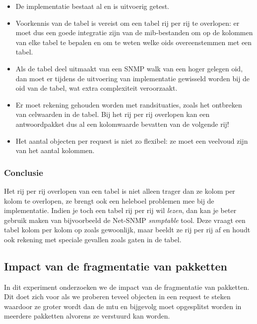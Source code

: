 \begin{itemize}
	\item De implementatie bestaat al en is uitvoerig getest.
	\item Voorkennis van de tabel is vereist om een tabel rij per rij te overlopen: er moet dus een goede integratie zijn van de \gls{mib}-bestanden
		om op de kolommen van elke tabel te bepalen en om te weten welke \glspl{oid} overeenstemmen met een tabel.
	\item Als de tabel deel uitmaakt van een SNMP walk van een hoger gelegen \gls{oid},
		dan moet er tijdens de uitvoering van implementatie gewisseld worden bij de \gls{oid} van de tabel, wat extra complexiteit veroorzaakt.
	\item Er moet rekening gehouden worden met randsituaties, zoals het ontbreken van celwaarden in de tabel\cite{net-snmp-table-holes}.
		Bij het rij per rij overlopen kan een antwoordpakket dus al een kolomwaarde bevatten van de volgende rij!
	\item Het aantal objecten per request is niet zo flexibel: ze moet een veelvoud zijn van het aantal kolommen.
\end{itemize}

\subsubsection{Conclusie}

Het rij per rij overlopen van een tabel is niet alleen trager dan ze kolom per kolom te overlopen,
ze brengt ook een heleboel problemen mee bij de implementatie.
Indien je toch een tabel rij per rij wil \textit{lezen}, dan kan je beter gebruik maken van bijvoorbeeld de Net-SNMP \textit{snmptable} tool.
Deze vraagt een tabel kolom per kolom op zoals gewoonlijk, maar beeldt ze rij per rij af en houdt ook rekening met speciale gevallen zoals gaten in de tabel.


\subsection{Impact van de fragmentatie van pakketten}

In dit experiment onderzoeken we de impact van de fragmentatie van pakketten.
Dit doet zich voor als we proberen teveel objecten in een request te steken waardoor ze groter wordt dan de \gls{mtu} en
bijgevolg moet opgesplitst worden in meerdere pakketten alvorens ze verstuurd kan worden.

